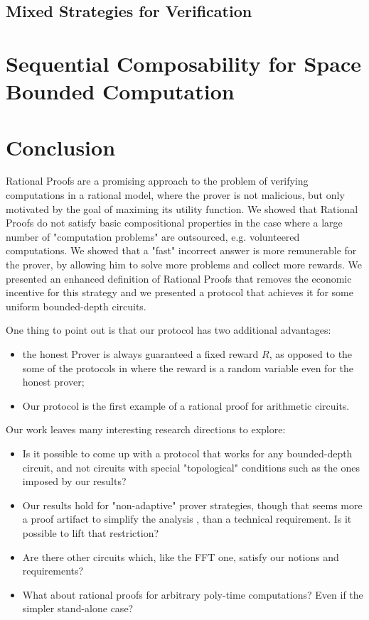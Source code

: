 \subsection{Mixed Strategies for Verification}



\section{Sequential Composability for Space Bounded Computation}
\label{sec:proofs-seq-comp}



\section{Conclusion}
Rational Proofs are a promising approach to the problem of verifying computations in a rational model, where the prover is not malicious, but only 
motivated by the goal of maximing its utility function. We showed that Rational Proofs do not satisfy basic compositional properties in the case where a large number of "computation problems" are outsourced, e.g. volunteered computations. We showed that a "fast" incorrect answer is more remunerable for the prover, by allowing him to solve more problems and collect more rewards.
We presented an enhanced definition of Rational Proofs that removes the economic incentive  for this strategy and we presented a protocol that achieves it for some uniform bounded-depth circuits.

One thing to point out is that our protocol has two additional advantages: 
\begin{itemize}
\item the honest Prover is always guaranteed a fixed reward $R$, as opposed to the some of the protocols in 
\cite{am,am1} where the reward is a random variable even for the honest prover;
\item Our protocol is the first example of a rational proof for arithmetic circuits. 
\end{itemize}

Our work leaves many interesting research directions to explore: 
\begin{itemize}
\item Is it possible to come up with a protocol that works for any bounded-depth circuit, and not circuits with special "topological" conditions such as the ones 
imposed by our results?
\item Our results hold for "non-adaptive" prover strategies, though that seems more a proof artifact to simplify the analysis , than a technical requirement. 
Is it possible to lift that restriction? 
\item Are there other circuits which, like the FFT one, satisfy our notions and requirements?
\item What about rational proofs for arbitrary poly-time computations? Even if the simpler stand-alone case?
\end{itemize}

